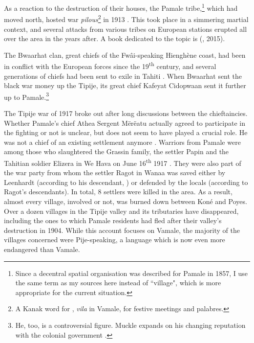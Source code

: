 As a reaction to the destruction of their houses, the Pamale tribe,\footnote{Since a decentral spatial organisation was described for Pamale in 1857, I use the same term as my sources here instead of ``village", which is more appropriate for the current situation.} which had moved north, hosted war \textit{pilous}\footnote{A Kanak word for , \textit{vila} in Vamale, for festive meetings and palabres.} in 1913 \parencite[266]{guiart_evenements_1970}. This took place in a simmering martial context, and several attacks from various tribes on European stations erupted all over the area in the years after. A book dedicated to the topic is  (\citeauthor{bensa_sanglots_2015}, 2015). 

The Bwaarhat clan, great chiefs of the Fwâi-speaking Hienghène coast, had been in conflict with the European forces since the 19\textsuperscript{th} century, and several generations of chiefs had been sent to exile in Tahiti \parencite[102]{clifford_person_1982}. When Bwaarhat sent the black war money up the Tipije, its great chief Kafeyat Cidopwaan sent it further up to Pamale.\footnote{He, too, is a controversial figure. Muckle expands on his changing reputation with the colonial government \parencite[139--141]{muckle_troublesome_2010}.}

The Tipije war of 1917 broke out after long discussions between the chieftaincies. Whether Pamale's chief Athea Sergent Mërëatu actually agreed to participate in the fighting or not is unclear, %
but does not seem to have played a crucial role. He was not a chief of an existing settlement anymore %
\parencite[277]{guiart_evenements_1970}. Warriors from Pamale were among those who slaughtered the Grassin family, the settler Papin and the Tahitian soldier Elizera in We Hava on June 16\textsuperscript{th} 1917 \parencite[24]{boubin-boyer_nouvelle-caledonie_2015}. They were also part of the war party from whom the settler Ragot in Wanaa was saved either by Leenhardt (according to his descendant, \citealt[20]{leenhardt_evenements_1978a}) or defended by the locals (according to Ragot's descendants). 
In total, 8 settlers were killed in the area. As a result, almost every village, involved or not, was burned down between Koné and Poyes. Over a dozen villages in the Tipije valley and its tributaries have disappeared, including the ones to which Pamale residents had fled after their valley's destruction in 1904. While this account focuses on Vamale, the majority of the villages concerned were Pije-speaking, a language which is now even more endangered than Vamale.


